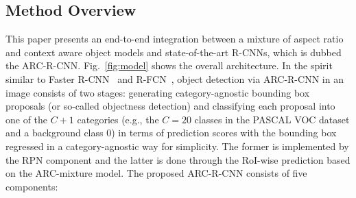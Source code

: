 \documentclass[10pt,twocolumn,letterpaper]{article}
\begin{document}
\subsection{Method Overview} 
\vspace{-1mm}
This paper presents an end-to-end integration between a mixture of aspect ratio and context aware object models and state-of-the-art R-CNNs, which is dubbed the ARC-R-CNN.
Fig.~\ref{fig:model} shows the overall architecture. 
In the spirit similar to Faster R-CNN~\cite{faster_rcnn} and R-FCN~\cite{rfcn}, object detection via ARC-R-CNN in an image consists of two stages: generating category-agnostic bounding box proposals (or so-called objectness detection) and classifying each proposal into one of the $C+1$ categories (e.g., the $C=20$ classes in the PASCAL VOC dataset and a background class $0$) in terms of prediction scores with the bounding box regressed in a category-agnostic way for simplicity. The former is implemented by the RPN component and the latter is done through the RoI-wise prediction based on the ARC-mixture model.
The proposed ARC-R-CNN consists of five components: 
\end{document}
